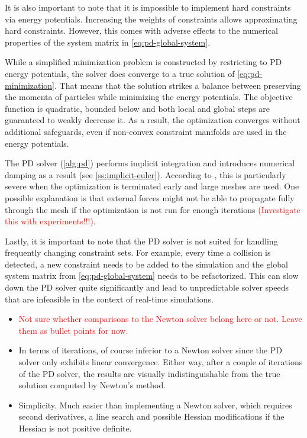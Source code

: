 It is also important to note that it is impossible to implement hard constraints via energy potentials. Increasing
the weights of constraints allows approximating hard constraints. However, this comes with adverse effects to the numerical properties of the 
system matrix in \cref{eq:pd-global-system}.

While a simplified minimization problem is constructed by restricting to PD energy potentials, the solver does converge to a 
true solution of \cref{eq:pd-minimization}. That means that the solution strikes a balance between preserving 
the momenta of particles while minimizing the energy potentials. The objective function is quadratic, bounded below and both local and 
global steps are guaranteed to weakly decrease it. As a result, the optimization converges without additional safeguards, even if 
non-convex constraint manifolds are used in the energy potentials.

The PD solver (\cref{alg:pd}) performs implicit integration and introduces numerical damping as a result (see \cref{ss:implicit-euler}).
According to \cite{bouaziz2014}, this is particularly severe when the optimization is terminated early and large meshes are used. One possible
explanation is that external forces might not be able to propagate fully through the mesh if the optimization is not run for enough iterations
\cite{bouaziz2014} \textcolor{red}{(Investigate this with experiments!!!)}.

Lastly, it is important to note that the PD solver is not suited for handling frequently changing constraint sets. For example, every time 
a collision is detected, a new constraint needs to be added to the simulation and the global system matrix from \ref{eq:pd-global-system} needs
to be refactorized. This can slow down the PD solver quite significantly and lead to unpredictable solver speeds that are infeasible in the
context of real-time simulations.

\begin{itemize}
    \item \textcolor{red}{Not sure whether comparisons to the Newton solver belong here or not. Leave them as bullet points for now.}
    \item In terms of iterations, of course inferior to a Newton solver since the PD solver only exhibits linear convergence. 
        Either way, after a couple of iterations of the PD solver, the results are visually 
        indistinguishable from the true solution computed by Newton's method.
    \item Simplicity. Much easier than implementing a Newton solver, which requires second derivatives, a line search and possible 
        Hessian modifications if the Hessian is not positive definite. 
\end{itemize}

